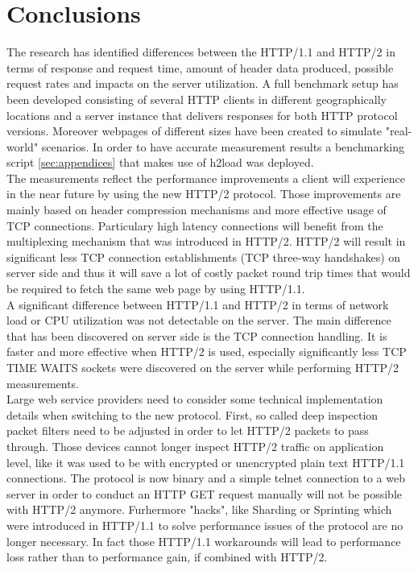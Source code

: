 \section{Conclusions}
\label{conclusion}

The research has identified differences between the HTTP/1.1 and HTTP/2 in terms of response and request time, amount of header data produced, possible request rates and impacts on the server utilization. A full benchmark setup has been developed consisting of several HTTP clients in different geographically locations and a server instance that delivers responses for both HTTP protocol versions. Moreover webpages of different sizes have been created to simulate "real-world" scenarios. In order to have accurate measurement results a benchmarking script \ref{sec:appendices} that makes use of h2load \cite{h2load} was deployed. 
\\
The measurements reflect the performance improvements a client will experience in the near future by using the new HTTP/2 protocol. Those improvements are mainly based on header compression mechanisms and more effective usage of TCP connections. Particulary high latency connections will benefit from the multiplexing mechanism that was introduced in HTTP/2. HTTP/2 will result in significant less TCP connection establishments (TCP three-way handshakes) on server side and thus it will save a lot of costly packet round trip times that would be required to fetch the same web page by using HTTP/1.1.
\\
A significant difference between HTTP/1.1 and HTTP/2 in terms of network load or CPU utilization was not detectable on the server. The main difference that has been discovered on server side is the TCP connection handling. It is faster and more effective when HTTP/2 is used, especially significantly less TCP TIME WAITS sockets were discovered on the server while performing HTTP/2 measurements.
\\
Large web service providers need to consider some technical implementation details when switching to the new protocol. First, so called deep inspection packet filters need to be adjusted in order to let HTTP/2 packets to pass through. Those devices cannot longer inspect HTTP/2 traffic on application level, like it was used to be with encrypted or unencrypted plain text HTTP/1.1 connections. The protocol is now binary and a simple telnet connection to a web server in order to conduct an HTTP GET request manually will not be possible with HTTP/2 anymore. Furhermore "hacks", like Sharding or Sprinting which were introduced in HTTP/1.1 to solve performance issues of the protocol are no longer necessary. In fact those HTTP/1.1 workarounds will lead to performance loss rather than to performance gain, if combined with HTTP/2.    

